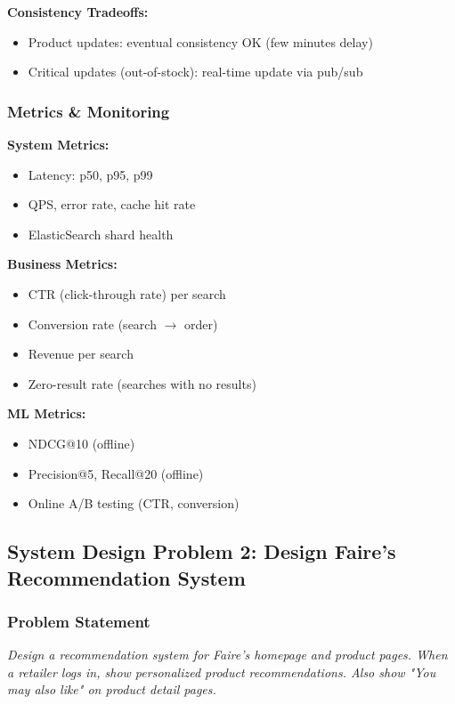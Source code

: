 \documentclass[11pt,letterpaper]{article}
\begin{document}
\textbf{Consistency Tradeoffs:}
\begin{itemize}
    \item Product updates: eventual consistency OK (few minutes delay)
    \item Critical updates (out-of-stock): real-time update via pub/sub
\end{itemize}

\subsubsection{Metrics \& Monitoring}

\textbf{System Metrics:}
\begin{itemize}
    \item Latency: p50, p95, p99
    \item QPS, error rate, cache hit rate
    \item ElasticSearch shard health
\end{itemize}

\textbf{Business Metrics:}
\begin{itemize}
    \item CTR (click-through rate) per search
    \item Conversion rate (search $\rightarrow$ order)
    \item Revenue per search
    \item Zero-result rate (searches with no results)
\end{itemize}

\textbf{ML Metrics:}
\begin{itemize}
    \item NDCG@10 (offline)
    \item Precision@5, Recall@20 (offline)
    \item Online A/B testing (CTR, conversion)
\end{itemize}

\subsection{System Design Problem 2: Design Faire's Recommendation System}

\subsubsection{Problem Statement}

\textit{Design a recommendation system for Faire's homepage and product pages. When a retailer logs in, show personalized product recommendations. Also show "You may also like" on product detail pages.}
\end{document}
